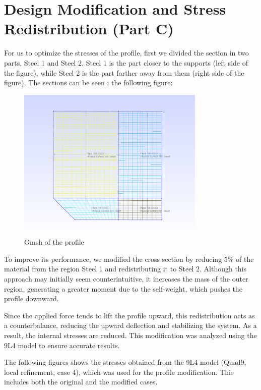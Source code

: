 \documentclass[12pt]{article}
\begin{document}
\newpage
\section{Design Modification and Stress Redistribution (Part C)}

For us to optimize the stresses of the profile, first we divided the section in two parts, Steel 1 and Steel 2. Steel 1 is the part closer to the supports (left side of the figure), while Steel 2 is the part farther away from them (right side of the figure). The sections can be seen i the following figure:

\begin{figure}[H]
    \centering
    \includegraphics[width=0.8\textwidth]{image.png}
    \caption{Gmsh of the profile}
    \label{fig:modified_profile_stress}
\end{figure}

To improve its performance, we modified the cross section by reducing 5\% of the material from the region Steel 1 and redistributing it to Steel 2. Although this approach may initially seem counterintuitive, it increases the mass of the outer region, generating a greater moment due to the self-weight, which pushes the profile downward.

Since the applied force tends to lift the profile upward, this redistribution acts as a counterbalance, reducing the upward deflection and stabilizing the system. As a result, the internal stresses are reduced. This modification was analyzed using the 9L4 model to ensure accurate results.

\newpage

The following figures shows the stresses obtained from the 9L4 model (Quad9, local refinement, case 4), which was used for the profile modification. This includes both the original and the modified cases.
\end{document}
